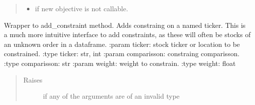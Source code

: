 \documentclass[letterpaper,10pt,english]{sphinxmanual}
\begin{document}
\begin{fulllineitems}
\begin{fulllineitems}
\begin{quote}
\begin{description}
\begin{itemize}
\item {} 
 \textendash{} if new objective is not callable.

\end{itemize}

\end{description}\end{quote}

\end{fulllineitems}


\begin{fulllineitems}
\label{\detokenize{dalio.model:dalio.model.MakeEfficientFrontier.add_sector_definitions}}
\end{fulllineitems}


\begin{fulllineitems}
\label{\detokenize{dalio.model:dalio.model.MakeEfficientFrontier.add_sector_weight_constraint}}
\end{fulllineitems}


\begin{fulllineitems}
\label{\detokenize{dalio.model:dalio.model.MakeEfficientFrontier.add_stock_weight_constraint}}
Wrapper to add\_constraint method. Adds constraing on a named
ticker.
This is a much more intuitive interface to add constraints, as these
will often be stocks of an unknown order in a dataframe.
:param ticker: stock ticker or location to be constrained.
:type ticker: str, int
:param comparisson: constraing comparisson.
:type comparisson: str
:param weight: weight to constrain.
:type weight: float
\begin{quote}\begin{description}
\item[{Raises}] \leavevmode
{} \textendash{} if any of the arguments are of an invalid type


\end{description}
\end{quote}
\end{fulllineitems}
\end{fulllineitems}
\end{document}
